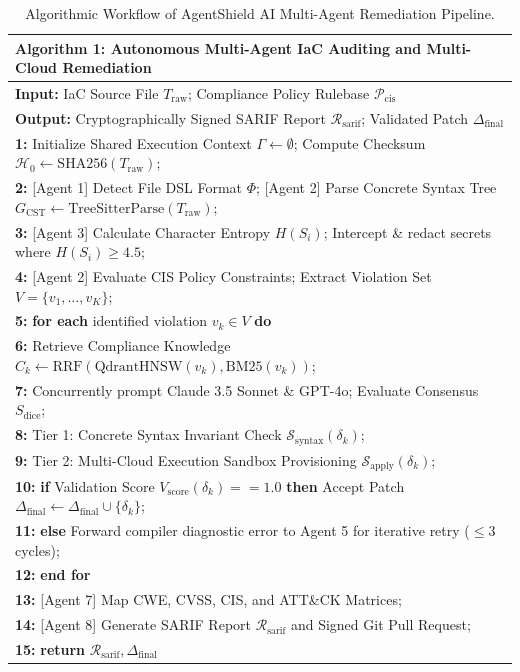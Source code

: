 \documentclass[runningheads]{llncs}
\begin{document}
\begin{table}[t]
\centering
\caption{Algorithmic Workflow of AgentShield AI Multi-Agent Remediation Pipeline.}
\label{tab:algorithm}
\begin{tabular}{|p{}|}
\hline
\textbf{Algorithm 1: Autonomous Multi-Agent IaC Auditing and Multi-Cloud Remediation} \\
\hline
\textbf{Input:} IaC Source File $T_{\mathrm{raw}}$; Compliance Policy Rulebase $\mathcal{P}_{\mathrm{cis}}$ \\
\textbf{Output:} Cryptographically Signed SARIF Report $\mathcal{R}_{\mathrm{sarif}}$; Validated Patch $\Delta_{\mathrm{final}}$ \\
\textbf{1:} Initialize Shared Execution Context $\Gamma \leftarrow \emptyset$; Compute Checksum $\mathcal{H}_0 \leftarrow \mathrm{SHA256}(T_{\mathrm{raw}})$; \\
\textbf{2:} [Agent 1] Detect File DSL Format $\Phi$; [Agent 2] Parse Concrete Syntax Tree $G_{\mathrm{CST}} \leftarrow \mathrm{TreeSitterParse}(T_{\mathrm{raw}})$; \\
\textbf{3:} [Agent 3] Calculate Character Entropy $H(S_i)$; Intercept \& redact secrets where $H(S_i) \ge 4.5$; \\
\textbf{4:} [Agent 2] Evaluate CIS Policy Constraints; Extract Violation Set $V = \{v_1, \dots, v_K\}$; \\
\textbf{5:} \textbf{for each} identified violation $v_k \in V$ \textbf{do} \\
\textbf{6:} \quad [Agent 4] Retrieve Compliance Knowledge $C_k \leftarrow \mathrm{RRF}(\mathrm{QdrantHNSW}(v_k), \mathrm{BM25}(v_k))$; \\
\textbf{7:} \quad [Agent 5] Concurrently prompt Claude 3.5 Sonnet \& GPT-4o; Evaluate Consensus $S_{\mathrm{dice}}$; \\
\textbf{8:} \quad [Agent 6] Tier 1: Concrete Syntax Invariant Check $\mathcal{S}_{\mathrm{syntax}}(\delta_k)$; \\
\textbf{9:} \quad [Agent 6] Tier 2: Multi-Cloud Execution Sandbox Provisioning $\mathcal{S}_{\mathrm{apply}}(\delta_k)$; \\
\textbf{10:} \quad \textbf{if} Validation Score $V_{\mathrm{score}}(\delta_k) == 1.0$ \textbf{then} Accept Patch $\Delta_{\mathrm{final}} \leftarrow \Delta_{\mathrm{final}} \cup \{\delta_k\}$; \\
\textbf{11:} \quad \textbf{else} Forward compiler diagnostic error to Agent 5 for iterative retry ($\le 3$ cycles); \\
\textbf{12:} \textbf{end for} \\
\textbf{13:} [Agent 7] Map CWE, CVSS, CIS, and ATT\&CK Matrices; \\
\textbf{14:} [Agent 8] Generate SARIF Report $\mathcal{R}_{\mathrm{sarif}}$ and Signed Git Pull Request; \\
\textbf{15:} \textbf{return} $\mathcal{R}_{\mathrm{sarif}}, \Delta_{\mathrm{final}}$ \\
\hline
\end{tabular}
\end{table}
\end{document}
